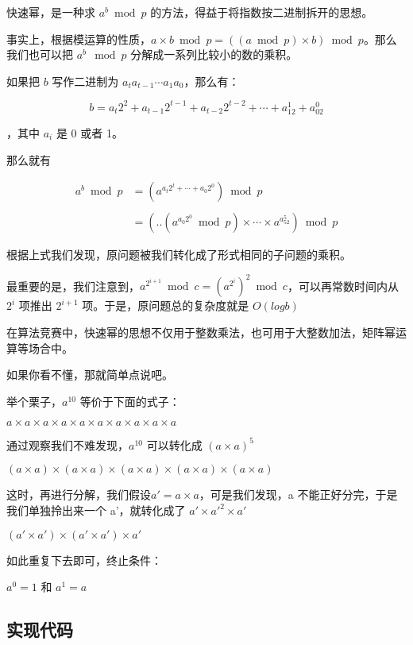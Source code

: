 
快速幂，是一种求 $a^b \bmod p$ 的方法，得益于将指数按二进制拆开的思想。

事实上，根据模运算的性质，$a \times b \bmod p = ((a \bmod p) \times b) \bmod p$。那么我们也可以把 $a^b \mod p$ 分解成一系列比较小的数的乘积。

如果把 $b$ 写作二进制为 $a_ta_{t-1} \cdots a_1a_0$，那么有：

$$
b = a_t2^2 + a_{t-1}2^{t-1} + a_{t-2}2^{t-2} + \cdots + a_12^1 + a_02^0
$$

，其中 $a_i$ 是 0 或者 1。

那么就有

$$
\begin{aligned}
a^b \bmod p & = (a^{a_t 2^t + \cdots + a_0 2^0}) \bmod p \\\\
& = (..(a^{a_0 2^0} \bmod p) \times \cdots \times a^{a_52^5}) \bmod p
\end{aligned}
$$

根据上式我们发现，原问题被我们转化成了形式相同的子问题的乘积。

最重要的是，我们注意到，$a^{2^{i+1}} \bmod c = (a^{2^i})^2 \bmod c$，可以再常数时间内从 $2^i$ 项推出 $2^{i+1}$ 项。于是，原问题总的复杂度就是 $O(logb)$

在算法竞赛中，快速幂的思想不仅用于整数乘法，也可用于大整数加法，矩阵幂运算等场合中。

如果你看不懂，那就简单点说吧。

举个栗子，$a^{10}$ 等价于下面的式子：

$a \times a \times a \times a \times a \times a \times a \times a \times a \times a$

通过观察我们不难发现，$a^{10}$ 可以转化成 $(a \times a)^{5}$

$\left(a \times a \right) \times\left(a \times a \right) \times \left(a \times a \right) \times \left(a \times a \right) \times \left(a \times a \right)$

这时，再进行分解，我们假设$a' =a \times a$，可是我们发现，a 不能正好分完，于是我们单独拎出来一个 a'，就转化成了 ${a' \times a' }^{2} \times a'$

$\left (a' \times a'\right) \times\left (a' \times a'\right) \times a'$

如此重复下去即可，终止条件：

$a^0=1$ 和 $a^1=a$

\subsection{实现代码}

